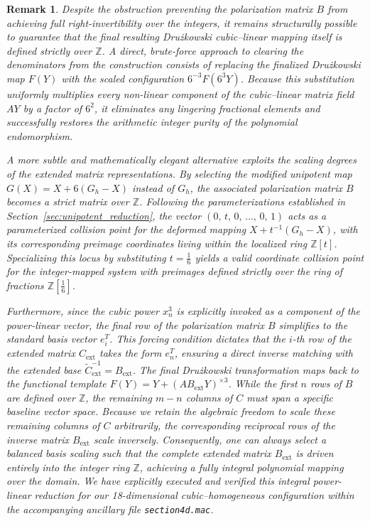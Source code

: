 \documentclass[11pt,a4paper]{article}
\newtheorem{remark}[theorem]{Remark}
\begin{document}
\begin{remark}
\label{rem:druz_integer_pure_construction}
Despite the obstruction preventing the polarization matrix $B$ from achieving full right-invertibility over the integers, it remains structurally possible to guarantee that the final resulting Dru\.{z}kowski cubic--linear mapping itself is defined strictly over $\mathbb{Z}$. A direct, brute-force approach to clearing the denominators from the construction consists of replacing the finalized Dru\.{z}kowski map $F(Y)$ with the scaled configuration $6^{-3} F(6^3 Y)$. Because this substitution uniformly multiplies every non-linear component of the cubic--linear matrix field $AY$ by a factor of $6^2$, it eliminates any lingering fractional elements and successfully restores the arithmetic integer purity of the polynomial endomorphism.

A more subtle and mathematically elegant alternative exploits the scaling degrees of the extended matrix representations. By selecting the modified unipotent map $G(X) = X + 6(G_h - X)$ instead of $G_h$, the associated polarization matrix $B$ becomes a strict matrix over $\mathbb{Z}$. Following the parameterizations established in Section~\ref{sec:unipotent_reduction}, the vector $(0, \, t, \, 0, \, \dots, \, 0, \, 1)$ acts as a parameterized collision point for the deformed mapping $X + t^{-1}(G_h - X)$, with its corresponding preimage coordinates living within the localized ring $\mathbb{Z}[t]$. Specializing this locus by substituting $t = \frac{1}{6}$ yields a valid coordinate collision point for the integer-mapped system with preimages defined strictly over the ring of fractions $\mathbb{Z}[\frac{1}{6}]$. 

Furthermore, since the cubic power $x_n^3$ is explicitly invoked as a component of the power-linear vector, the final row of the polarization matrix $B$ simplifies to the standard basis vector $e_i^T$. This forcing condition dictates that the $i$-th row of the extended matrix $C_{\text{ext}}$ takes the form $e_n^T$, ensuring a direct inverse matching with the extended base $\tilde{C}_{\text{ext}}^{-1} = B_{\text{ext}}$. The final Dru\.{z}kowski transformation maps back to the functional template $F(Y) = Y + (A B_{\text{ext}} Y)^{\times 3}$. While the first $n$ rows of $B$ are defined over $\mathbb{Z}$, the remaining $m-n$ columns of $C$ must span a specific baseline vector space. Because we retain the algebraic freedom to scale these remaining columns of $C$ arbitrarily, the corresponding reciprocal rows of the inverse matrix $B_{\text{ext}}$ scale inversely. Consequently, one can always select a balanced basis scaling such that the complete extended matrix $B_{\text{ext}}$ is driven entirely into the integer ring $\mathbb{Z}$, achieving a fully integral polynomial mapping over the domain. We have explicitly executed and verified this integral power-linear reduction for our 18-dimensional cubic--homogeneous configuration within the accompanying ancillary file \texttt{section4d.mac}.
\end{remark}
\end{document}
